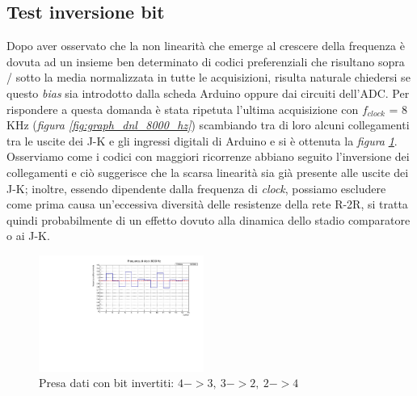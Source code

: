 \documentclass[journal]{IEEEtran}
\begin{document}
\subsection{Test inversione bit}
Dopo aver osservato che la non linearità che emerge al crescere della frequenza è dovuta ad un insieme ben determinato di codici preferenziali che risultano sopra / sotto la media normalizzata in tutte le acquisizioni, risulta naturale chiedersi se questo \textit{bias} sia introdotto dalla scheda Arduino oppure dai circuiti dell'ADC. Per rispondere a questa domanda è stata ripetuta l'ultima acquisizione con $f_{clock}$ = 8 KHz (\textit{figura \ref{fig:graph_dnl_8000_hz}}) scambiando tra di loro alcuni collegamenti tra le uscite dei J-K e gli ingressi digitali di Arduino e si è ottenuta la \textit{figura}  \textit{\ref{fig:graph_dnl_non_lin}}.
Osserviamo come i codici con maggiori ricorrenze abbiano seguito l'inversione dei collegamenti e ciò suggerisce che la scarsa linearità sia già presente alle uscite dei J-K; inoltre, essendo dipendente dalla frequenza di \textit{clock}, possiamo escludere come prima causa un'eccessiva diversità delle resistenze della rete R-2R, si tratta quindi probabilmente di un effetto dovuto alla dinamica dello stadio comparatore o ai J-K. 

\begin{figure}[H]%
\begin{center}
\includegraphics[width=0.48\textwidth]{analysis/output/dnl_non_lin_8000hz_bars.pdf}
\caption{Presa dati con bit invertiti: $ 4->3, \ 3->2, \ 2->4 $}
\label{fig:graph_dnl_non_lin}
\end{center}
\end{figure}



\end{document}
